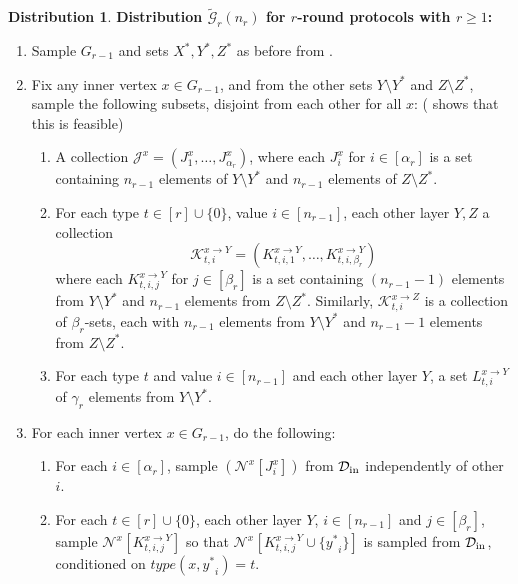 \documentclass[11pt]{article}
\theoremstyle{definition}
\newtheorem{mddistribution}{Distribution}
\newenvironment{Distribution}{\begin{tbox}\begin{mddistribution}}{\end{mddistribution}\end{tbox}}
\renewcommand{\geq}{\geqslant}
\newenvironment{tbox}{\begin{tcolorbox}[
		enlarge top by=5pt,
		enlarge bottom by=5pt,
		 breakable,
		 boxsep=0pt,
                  left=4pt,
                  right=4pt,
                  top=10pt,
                  arc=4pt,
                  boxrule=1pt,toprule=1pt,
                  colback=white
                  ]%
	}
{\end{tcolorbox}}
\newcounter{mybox}
\renewcommand{\themybox}{\arabic{mybox}}
\newcommand{\namethebox}{\begin{center}\textbf{Box~\themybox} \end{center}}
\newcommand{\Xstar}{\ensuremath{X^{*}}}
\newcommand{\ystar}{\ensuremath{y^{*}}}
\newcommand{\Ystar}{\ensuremath{Y^{*}}}
\newcommand{\Zstar}{\ensuremath{Z^{*}}}
\newcommand{\Nbtogether}[2]{\ensuremath{\mathcal{N}^{#1_{#2}}}}
\newcommand{\cD}{\ensuremath{\mathcal{D}}}
\newcommand{\cG}{\ensuremath{\mathcal{G}}}
\newcommand{\cGtil}{\ensuremath{\widetilde{\cG}}}
\newcommand{\cDmarg}{\ensuremath{\cD_{\textnormal{in}}}}
\newcommand{\cJ}{\ensuremath{\mathcal{J}}}
\newcommand{\cK}{\ensuremath{\mathcal{K}}}
\newcommand{\cJup}[1]{\ensuremath{\cJ^{#1}}}
\newcommand{\Jupdown}[2]{\ensuremath{J^{#1}_{#2}}}
\newcommand{\cKupdown}[2]{\ensuremath{\cK^{#1}_{#2}}}
\newcommand{\Kupdown}[2]{\ensuremath{K^{#1}_{#2}}}
\newcommand{\Lupdown}[2]{\ensuremath{L^{#1}_{#2}}}
\begin{document}
\begin{Distribution}\label{box:cGtilr-definition}
			\textbf{Distribution $\cGtil_r(n_r)$ for $r$-round protocols with $r \geq 1$:}
		\begin{enumerate}[label=$(\arabic*)$]
			\item Sample $G_{r-1}$ and sets $\Xstar, \Ystar, \Zstar$ as before from . 
			
			\item \label{item:disjt-sampling-1} Fix any inner vertex $x \in G_{r-1}$, and from the other sets $Y \setminus \Ystar$ and $Z \setminus \Zstar$, sample the following subsets, disjoint from each other for all $x$: ( shows that this is feasible)
			\begin{enumerate}[label=$(\alph*)$]
				\item \label{item:J-appears} A collection $\cJup{x} = (\Jupdown{x}{1},  \ldots, \Jupdown{x}{\alpha_r})$, where each $\Jupdown{x}{i}  $ for $i \in [\alpha_r]$ is a set containing $n_{r-1}$ elements of $Y \setminus \Ystar$ and $n_{r-1}$ elements of $Z \setminus \Zstar$.
				\item \label{item:K-appears} For each type $t \in [r] \cup \{0\}$, value $i \in [n_{r-1}]$, each other layer $Y, Z$ a collection 
				\[
				\cKupdown{x \to Y}{ t, i} = (\Kupdown{x \to Y}{ t, i, 1}, \ldots, \Kupdown{x \to Y}{t, i, \beta_r})
				\]
				 where each $\Kupdown{x \to Y}{t, i, j}$ for $j \in [\beta_r]$ is a set containing $(n_{r-1}-1)$ elements from $Y \setminus \Ystar$ and $n_{r-1}$ elements from $Z \setminus \Zstar$. Similarly, $\cKupdown{x \to Z}{t,i}$ is a collection of $\beta_r$-sets, each with $n_{r-1}$ elements from $Y \setminus \Ystar$ and $n_{r-1}-1$ elements from $Z \setminus \Zstar$. 
				\item \label{item:L-appears} For each type $t$ and value $i \in [n_{r-1}]$ and each other layer $Y$, a set $\Lupdown{x \to Y}{t, i}$ of $\gamma_r$ elements from $Y \setminus \Ystar$.
				\end{enumerate}
			\item \label{item:disjt-sampling-2} For each inner vertex $x \in G_{r-1}$,  do the following: 
			\begin{enumerate}
				\item For each $i \in [\alpha_r]$, sample $(\Nbtogether{x}{}[\Jupdown{x }{i}])$ from $\cDmarg{}$ independently of other $i$.
				\item For each $t \in [r] \cup \{0\}$, each other layer $Y$,  $i \in [n_{r-1}]$ and $j \in [\beta_r]$, sample $\Nbtogether{x}{}[\Kupdown{x \to Y}{t, i, j}]$ so that $\Nbtogether{x}{}[\Kupdown{x \to Y}{t, i, j} \cup \{\ystar_i\}]$ is sampled from $\cDmarg$, conditioned on  $type(x, \ystar_i)=t$. 

\end{enumerate}
\end{enumerate}
\end{Distribution}
\end{document}
